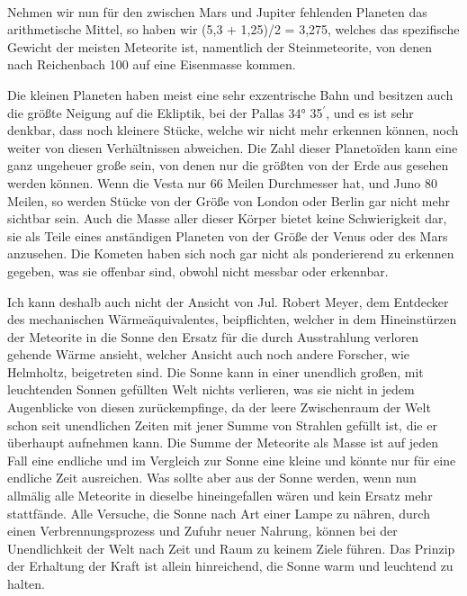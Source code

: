 \documentclass[a4paper, 11pt, oneside, german]{article}
\begin{document}
\paragraph{}
Nehmen wir nun für den zwischen Mars und Jupiter fehlenden Planeten das arithmetische Mittel, so haben wir (5,3 + 1,25)/2 = 3,275, welches das spezifische Gewicht der meisten Meteorite ist, namentlich der Steinmeteorite, von denen nach Reichenbach 100 auf eine Eisenmasse kommen.

Die kleinen Planeten haben meist eine sehr exzentrische Bahn und besitzen auch die größte Neigung auf die Ekliptik, bei der Pallas 34° 35$^{\prime}$, und es ist sehr denkbar, dass noch kleinere Stücke, welche wir nicht mehr erkennen können, noch weiter von diesen Verhältnissen abweichen. Die Zahl dieser Planetoïden kann eine ganz ungeheuer große sein, von denen nur die größten von der Erde aus gesehen werden können. Wenn die Vesta nur 66 Meilen Durchmesser hat, und Juno 80 Meilen, so werden Stücke von der Größe von London oder Berlin gar nicht mehr sichtbar sein. Auch die Masse aller dieser Körper bietet keine Schwierigkeit dar, sie als Teile eines anständigen Planeten von der Größe der Venus oder des Mars anzusehen. Die Kometen haben sich noch gar nicht als ponderierend zu erkennen gegeben, was sie offenbar sind, obwohl nicht messbar oder erkennbar.

Ich kann deshalb auch nicht der Ansicht von Jul. Robert Meyer, dem Entdecker des mechanischen Wärmeäquivalentes, beipflichten, welcher in dem Hineinstürzen der Meteorite in die Sonne den Ersatz für die durch Ausstrahlung verloren gehende Wärme ansieht, welcher Ansicht auch noch andere Forscher, wie Helmholtz, beigetreten sind. Die Sonne kann in einer unendlich großen, mit leuchtenden Sonnen gefüllten Welt nichts verlieren, was sie nicht in jedem Augenblicke von diesen zurückempfinge, da der leere Zwischenraum der Welt schon seit unendlichen Zeiten mit jener Summe von Strahlen gefüllt ist, die er überhaupt aufnehmen kann. Die Summe der Meteorite als Masse ist auf jeden Fall eine endliche und im Vergleich zur Sonne eine kleine und könnte nur für eine endliche Zeit ausreichen. Was sollte aber aus der Sonne werden, wenn nun allmälig alle Meteorite in dieselbe hineingefallen wären und kein Ersatz mehr stattfände. Alle Versuche, die Sonne nach Art einer Lampe zu nähren, durch einen Verbrennungsprozess und Zufuhr neuer Nahrung, können bei der Unendlichkeit der Welt nach Zeit und Raum zu keinem Ziele führen. Das Prinzip der Erhaltung der Kraft ist allein hinreichend, die Sonne warm und leuchtend zu halten.
\end{document}
